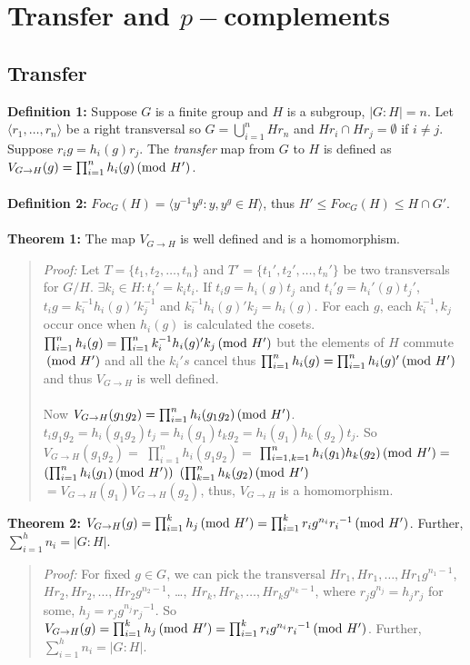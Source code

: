 \chapter{Transfer and $p-$complements}
\section{Transfer}
{\bf Definition 1:}  Suppose $G$ is a finite group and $H$ is a subgroup, $|G:H|=n$.  
Let $ \langle r_1, \ldots, r_n \rangle $ be a right transversal so $G= \bigcup_{i=1}^n Hr_n$ and
$Hr_i \cap Hr_j = \emptyset$ if $i \ne j$.  Suppose $r_i g= h_i(g) r_j$.
The \emph {transfer} map from $G$ to $H$ is defined as 
$V_{G \rightarrow H}(g)= \prod_{i=1}^n h_i(g) \thinspace \textnormal{(mod } H' \textnormal{)}$.
\\
\\
{\bf Definition 2:} $Foc_G(H)= \langle y^{-1} y^g: y, y^g \in H \rangle $, 
thus $H' \le Foc_G(H) \le H \cap G'$.
\\
\\
{\bf Theorem 1:}
The map $V_{G \rightarrow H}$ is well defined and is a homomorphism.
\begin{quote}
\emph{Proof:}  
Let 
$T= \{ t_1 , t_2 , \ldots , t_n \}$ and
$T'= \{ t_1' , t_2' , \ldots , t_n' \}$ be two transversals for $G/H$.
$\exists k_i \in H: t_i'= k_i t_i$.  If 
$t_i g = h_i(g) t_j$ and
$t_i' g = h_i'(g) t_j'$, $t_i g= k_i^{-1} h_i(g)' k_j^{-1}$ and $k_i^{-1} h_i(g)' k_j = h_i(g)$.
For each $g$, each $k_i^{-1}, k_j$ occur once when $h_i(g)$ is calculated the cosets.
$\prod_{i=1}^n h_i(g) = \prod_{i=1}^n k_i^{-1} h_i(g)' k_j \thinspace \textnormal{(mod } H' \textnormal{)}$ but the elements of $H$
commute $\thinspace \textnormal{(mod } H' \textnormal{)}$ and all the $k_i's$ cancel thus
$\prod_{i=1}^n h_i(g) = \prod_{i=1}^n  h_i(g)' \thinspace \textnormal{(mod } H' \textnormal{)}$ and 
thus $V_{G \rightarrow H}$ is well defined.
\\
\\
Now 
$V_{G \rightarrow H}(g_1 g_2)= \prod_{i=1}^n h_i(g_1 g_2) \thinspace \textnormal{(mod } H' \textnormal{)}$.
$t_i g_1 g_2 = h_i(g_1 g_2) t_j = h_i(g_1) t_k g_2 = h_i(g_1) h_k(g_2) t_j$. So
$V_{G \rightarrow H}(g_1 g_2) = $
$\prod_{i=1}^n h_i(g_1 g_2) =$ $ \prod_{i=1, k=1}^n h_i(g_1) h_k(g_2) \thinspace \textnormal{(mod } H' \textnormal{)} =$
$(\prod_{i=1}^n h_i(g_1) \thinspace \textnormal{(mod } H' \textnormal{)})$ $(\prod_{k=1}^n h_k(g_2) \thinspace \textnormal{(mod } H' \textnormal{)}$ 
$= V_{G \rightarrow H}(g_1) V_{G \rightarrow H}(g_2)$,
thus, $V_{G \rightarrow H}$ is a homomorphism.
\end{quote}
{\bf Theorem 2:} 
$V_{G \rightarrow H}(g)= \prod_{i=1}^k  h_j \thinspace \textnormal{(mod } H' \textnormal{)}
= \prod_{i=1}^k  r_i g^{n_i}{r_i}^{-1} \thinspace \textnormal{(mod } H' \textnormal{)}$.  Further, $\sum_{i=1}^h n_i = |G:H|$.
\begin{quote}
\emph{Proof:}  
For fixed $g \in G$, we can pick the transversal 
$Hr_1, H r_1, \ldots, H r_1 g^{n_1 -1}$,
$Hr_2, H r_2, \ldots, H r_2 g^{n_2 -1}$, \ldots,
$Hr_k, H r_k, \ldots, H r_k g^{n_k -1}$, where $r_j g^{n_j} = h_j r_j$ for
some, $h_j= r_j g^{n_j}{r_j}^{-1}$. So
$V_{G \rightarrow H}(g)= \prod_{i=1}^k  h_j \thinspace \textnormal{(mod } H' \textnormal{)}
= \prod_{i=1}^k  r_i g^{n_i}{r_i}^{-1} \thinspace \textnormal{(mod } H' \textnormal{)}$.  Further, $\sum_{i=1}^h n_i = |G:H|$.
\end{quote}
